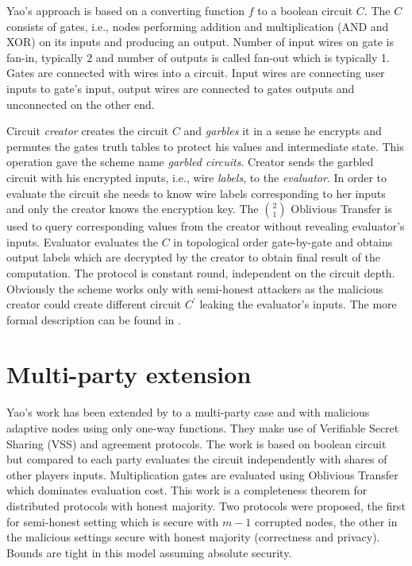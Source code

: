 \documentclass[
  digital, %
  twoside, %
  table,   %
  lof,     %
  lot,     %
]{fithesis3}
\begin{document}
Yao's approach is based on a converting function $f$ to a boolean circuit $C$. The $C$ consists of gates, i.e., nodes performing addition and multiplication (AND and XOR) on its inputs and producing an output. Number of input wires on gate is fan-in, typically 2 and number of outputs is called fan-out which is typically 1. Gates are connected with wires into a circuit. Input wires are connecting user inputs to gate's input, output wires are connected to gates outputs and unconnected on the other end.

Circuit \emph{creator} creates the circuit $C$ and \emph{garbles} it in a sense he encrypts and permutes the gates truth tables to protect his values and intermediate state. This operation gave the scheme name \emph{garbled circuits}. Creator sends the garbled circuit with his encrypted inputs, i.e., wire \emph{labels}, to the \emph{evaluator}. In order to evaluate the circuit she needs to know wire labels corresponding to her inputs and only the creator knows the encryption key. The $\binom{2}{1}$ Oblivious Transfer is used to query corresponding values from the creator without revealing evaluator's inputs. Evaluator evaluates the $C$ in topological order gate-by-gate and obtains output labels which are decrypted by the creator to obtain final result of the computation. The protocol is constant round, independent on the circuit depth. 
Obviously the scheme works only with semi-honest attackers as the malicious creator could create different circuit $C^\prime$ leaking the evaluator's inputs. The more formal description can be found in \cite{BHR12}. 

\section{Multi-party extension}%
Yao's work has been extended by \cite{GMW87} to a multi-party case and with malicious adaptive nodes using only one-way functions. They make use of Verifiable Secret Sharing (VSS) and agreement protocols. The work is based on boolean circuit but compared to \cite{Yao86} each party evaluates the circuit independently with shares of other players inputs. Multiplication gates are evaluated using Oblivious Transfer which dominates evaluation cost. This work is a completeness theorem for distributed protocols with honest majority. Two protocols were proposed, the first for semi-honest setting which is secure with $m-1$ corrupted nodes, the other in the malicious settings secure with honest majority (correctness and privacy). Bounds are tight in this model assuming absolute security. 
\end{document}
